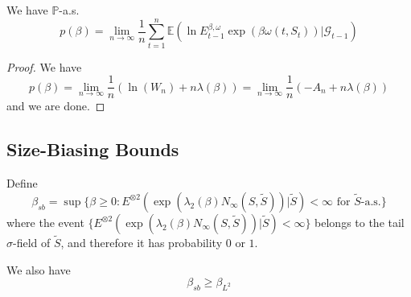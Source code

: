 \begin{corollary}
    We have $\mathbb{P}$-a.s.
    \[
    p(\beta) = \lim_{n\to\infty}\dfrac{1}{n}\sum\limits_{t=1}^n \mathbb{E}(\ln E_{t-1}^{\beta,\omega}\exp{(\beta\omega(t,S_t))}|\mathcal{G}_{t-1})
    \]
\end{corollary}
\begin{proof}
    We have
    \[
    p(\beta) = \lim_{n\to\infty}\dfrac{1}{n} (\ln(W_n) + n\lambda(\beta)) = \lim_{n\to\infty}\dfrac{1}{n}(-A_n + n\lambda(\beta))
    \]
    and we are done.
\end{proof}

\subsection{Size-Biasing Bounds}

\begin{definition}
    Define
    \[
    \beta_{sb} = \sup\{\beta \geq 0: E^{\otimes 2}(\exp(\lambda_2(\beta)N_{\infty}(S,\tilde{S}))|\tilde{S}) < \infty\text{ for }\tilde{S}\text{-a.s.}\}
    \]
    where the event $\{ E^{\otimes 2}(\exp(\lambda_2(\beta)N_{\infty}(S,\tilde{S}))|\tilde{S}) < \infty\}$ belongs to the tail $\sigma$-field of $\tilde{S}$, and therefore it has probability $0$ or $1$.\par
    We also have
    \[\beta_{sb} \geq \beta_{L^2}\]
\end{definition}

